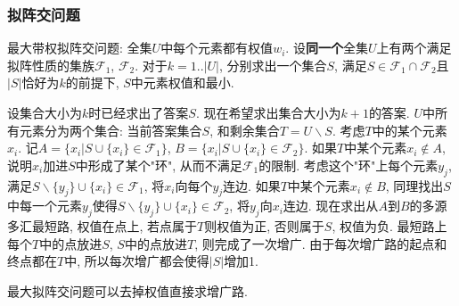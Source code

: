 \subsubsection{拟阵交问题}
最大带权拟阵交问题: 全集$U$中每个元素都有权值$w_i$. 设\textbf{同一个}全集$U$上有两个满足拟阵性质的集族$\mathcal{F}_1$, $\mathcal{F}_2$. 对于$k=1..|U|$, 分别求出一个集合$S$, 满足$S\in \mathcal{F}_1 \cap\mathcal{F}_2$且$|S|$恰好为$k$的前提下, $S$中元素权值和最小.

设集合大小为$k$时已经求出了答案$S$. 现在希望求出集合大小为$k+1$的答案. 
$U$中所有元素分为两个集合: 当前答案集合$S$, 和剩余集合$T=U\backslash S$. 考虑$T$中的某个元素$x_i$. 记$A=\{x_i|S\cup \{x_i\}\in\mathcal{F}_1\}$, $B=\{x_i|S\cup \{x_i\}\in\mathcal{F}_2\}$.
如果$T$中某个元素$x_i\notin A$, 说明$x_i$加进$S$中形成了某个"环", 从而不满足$\mathcal{F}_1$的限制. 考虑这个"环"上每个元素$y_j$, 满足$S\backslash\{y_j\}\cup \{x_i\}\in\mathcal{F}_1$, 将$x_i$向每个$y_j$连边.
如果$T$中某个元素$x_i\notin B$, 同理找出$S$中每一个元素$y_j$使得$S\backslash\{y_j\}\cup \{x_i\}\in\mathcal{F}_2$, 将$y_j$向$x_i$连边.
现在求出从$A$到$B$的多源多汇最短路, 权值在点上, 若点属于$T$则权值为正, 否则属于$S$, 权值为负. 最短路上每个$T$中的点放进$S$, $S$中的点放进$T$, 则完成了一次增广.
由于每次增广路的起点和终点都在$T$中, 所以每次增广都会使得$|S|$增加1.

最大拟阵交问题可以去掉权值直接求增广路.